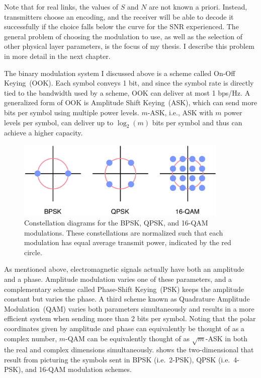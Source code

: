 Note that for real links, the values of $S$ and $N$ are not known a priori. Instead, transmitters choose an encoding, and the receiver will be able to decode it successfully if the choice falls below the curve for the SNR experienced. The general problem of choosing the modulation to use, as well as the selection of other physical layer parameters, is the focus of my thesis. I describe this problem in more detail in the next chapter.

The binary modulation system I discussed above is a scheme called On-Off Keying~(OOK\@). Each symbol conveys 1 bit, and since the symbol rate is directly tied to the bandwidth used by a scheme, OOK can deliver at most 1 bps/Hz. A generalized form of OOK is Amplitude Shift Keying~(ASK\@), which can send more bits per symbol using multiple power levels. $m$-ASK, i.e., ASK with $m$ power levels per symbol, can deliver up to $\log_2(m)$ bits per symbol and thus can achieve a higher capacity.

\begin{figure}[t]
\centering
\includegraphics[width=0.9\textwidth]{figures/background/constellations_radius.pdf}
\caption[Constellation diagrams for the BPSK, QPSK, and 16-QAM modulations]{\label{fig:constellations}Constellation diagrams for the BPSK, QPSK, and 16-QAM modulations. These constellations are normalized such that each modulation has equal average transmit power, indicated by the red circle.}
\end{figure}

As mentioned above, electromagnetic signals actually have both an amplitude and a phase. Amplitude modulation varies one of these parameters, and a complementary scheme called Phase-Shift Keying~(PSK) keeps the amplitude constant but varies the phase. A third scheme known as Quadrature Amplitude Modulation~(QAM) varies both parameters simultaneously and results in a more efficient system when sending more than 2 bits per symbol. Noting that the polar coordinates given by amplitude and phase can equivalently be thought of as a complex number, $m$-QAM can be equivalently thought of as $\sqrt{m}$-ASK in both the real and complex dimensions simultaneously.  shows the two-dimensional  that result from picturing the symbols sent in BPSK (i.e.\ 2-PSK), QPSK (i.e.\ 4-PSK), and 16-QAM modulation schemes.

